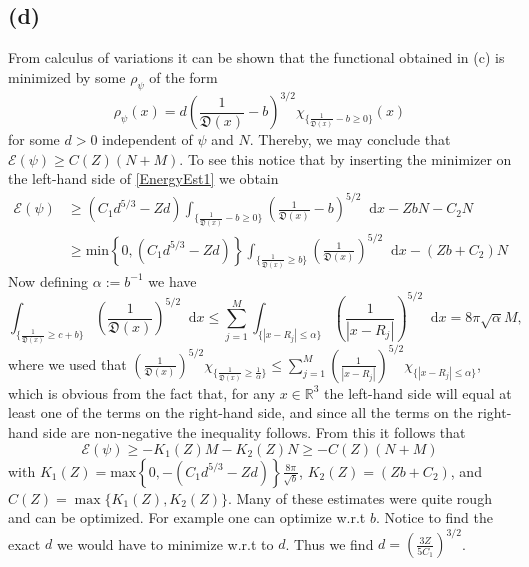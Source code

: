 \documentclass[a4paper,11pt]{article}
\newcommand{\abs}[1]{\left\lvert #1 \right\rvert}
\newcommand*\diff{\mathop{}\!\mathrm{d}}
\newcommand{\R}{\mathbb{R}}
\numberwithin{equation}{section}
\begin{document}
 \subsection*{(d)}
 From calculus of variations it can be shown that the functional obtained in (c) is minimized by some $ \rho_\psi $ of the form \begin{equation}
 \rho_{\psi}(x)=d\left(\frac{1}{\mathfrak{D}(x)}-b\right)^{3/2}\chi_{\{\frac{1}{\mathfrak{D}(x)}-b\geq 0\}}(x)
 \end{equation}
 for some $ d>0$ independent of $ \psi $ and $ N $. Thereby, we may conclude that $ \mathcal{E}(\psi)\geq C(Z)(N+M) $. To see this notice that by inserting the minimizer on the left-hand side of \eqref{EnergyEst1} we obtain \begin{equation}\begin{aligned}
 \mathcal{E}(\psi)&\geq (C_1d^{5/3}-Zd)\int_{\{\frac{1}{\mathfrak{D}(x)}-b\geq 0\}}\left(\frac{1}{\mathfrak{D}(x)}-b\right)^{5/2}\diff x-ZbN-C_2N\\&\geq\text{min}\left\{0,(C_1d^{5/3}-Zd)\right\}\int_{\{\frac{1}{\mathfrak{D}(x)}\geq b\}}\left(\frac{1}{\mathfrak{D}(x)}\right)^{5/2}\diff x-(Zb+C_2)N
 \end{aligned}
 \end{equation}
 Now defining $ \alpha:=b^{-1} $ we have \begin{equation}
 \int_{\{\frac{1}{\mathfrak{D}(x)}\geq c+b\}}\left(\frac{1}{\mathfrak{D}(x)}\right)^{5/2}\diff x\leq\sum_{j=1}^{M}\int_{\{\abs{x-R_j}\leq \alpha\}}\left(\frac{1}{\abs{x-R_j}}\right)^{5/2}\diff x=8\pi\sqrt{\alpha} M,
 \end{equation}
 where we used that $\left(\frac{1}{\mathfrak{D}(x)}\right)^{5/2} \chi_{\{\frac{1}{\mathfrak{D}(x)}\geq \frac{1}{\alpha}\}}\leq\sum_{j=1}^{M}\left(\frac{1}{\abs{x-R_j}}\right)^{5/2}\chi_{\{\abs{x-R_j}\leq \alpha\}} $, which is obvious from the fact that, for any $ x\in \R^3 $ the left-hand side will equal at least one of the terms on the right-hand side, and since all the terms on the right-hand side are non-negative the inequality follows.
 From this it follows that \begin{equation}
 \mathcal{E}(\psi)\geq -K_1(Z)M-K_2(Z)N\geq-C(Z)(N+M)
 \end{equation}
 with $ K_1(Z)=\text{max}\left\{0,-(C_1d^{5/3}-Zd)\right\}\frac{8\pi}{\sqrt{b}} $, $ K_2(Z)=(Zb+C_2) $, and\\ $C(Z)=\max\{K_1(Z),K_2(Z)\}$. Many of these estimates were quite rough and can be optimized. For example one can optimize w.r.t $ b $. Notice to find the exact $ d $ we would have to minimize w.r.t to $ d $. Thus we find $ d=\left(\frac{3Z}{5C_1}\right)^{3/2} $.
 
\end{document}
